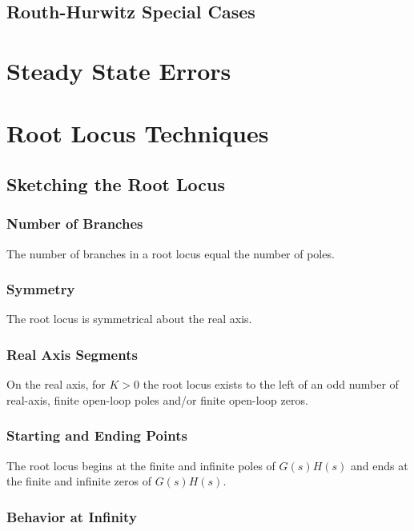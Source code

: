 \documentclass[11pt]{article}
\begin{document}
    \subsection{Routh-Hurwitz Special Cases}
    \section{Steady State Errors}
    \section{Root Locus Techniques}
    \subsection{Sketching the Root Locus}

    \subsubsection{Number of Branches}

    The number of branches in a root locus equal the number of poles.

    \subsubsection{Symmetry}

    The root locus is symmetrical about the real axis.

    \subsubsection{Real Axis Segments}

    On the real axis, for $K > 0$ the root locus exists to the left of an odd number of real-axis, finite open-loop poles and/or finite open-loop zeros.

    \subsubsection{Starting and Ending Points}

    The root locus begins at the finite and infinite poles of $G(s)H(s)$ and ends at the finite and infinite zeros of $G(s)H(s)$.

    \subsubsection{Behavior at Infinity}
\end{document}
